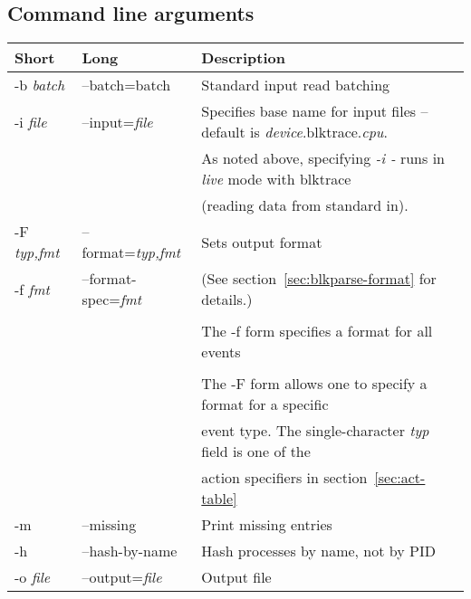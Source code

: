 \documentclass{article}
\begin{document}
\newpage\subsection{\label{sec:blkparse-args}Command line arguments}
\begin{tabular}{|l|l|l|}\hline
Short              & Long                       & Description \\ \hline\hline
-b \emph{batch}    & --batch={batch}            & Standard input read batching \\ \hline

-i \emph{file}     & --input=\emph{file}        & Specifies base name for input files -- default is \emph{device}.blktrace.\emph{cpu}. \\
                   &                            & As noted above, specifying \emph{-i -} runs in \emph{live} mode with blktrace \\
		   &                            & (reading data from standard in). \\ \hline

-F \emph{typ,fmt}  & --format=\emph{typ,fmt}    & Sets output format \\
-f \emph{fmt}      & --format-spec=\emph{fmt}   & (See section~\ref{sec:blkparse-format} for details.) \\ 
                   &                            & \\
		   &                            & The -f form specifies a format for all events \\
                   &                            & \\
		   &                            & The -F form allows one to specify a format for a specific \\
		   &                            & event type. The single-character \emph{typ} field is one of the \\
		   &                            & action specifiers in section~\ref{sec:act-table} \\ \hline


-m                 & --missing                  & Print missing entries\\ \hline

-h                 & --hash-by-name             & Hash processes by name, not by PID\\ \hline

-o \emph{file}     & --output=\emph{file}       & Output file \\ \hline


\end{tabular}
\end{document}
